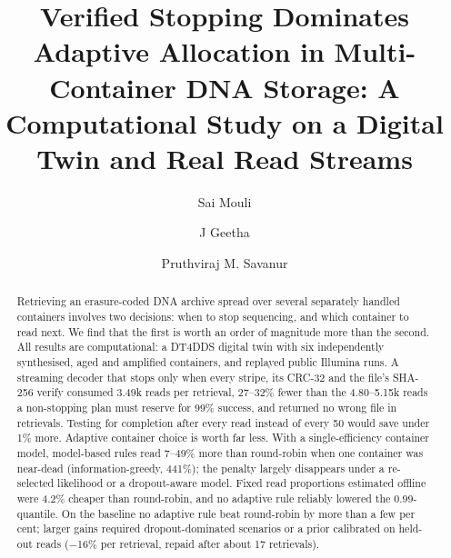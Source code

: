 \documentclass[acmsmall,screen]{acmart}
\begin{document}
\title[Verified Stopping Dominates Adaptive Allocation in Multi-Container DNA Storage]{Verified Stopping Dominates Adaptive Allocation in Multi-Container DNA Storage: A Computational Study on a Digital Twin and Real Read Streams}

\author{Sai Mouli}

\author{J Geetha}

\author{Pruthviraj M. Savanur}

\renewcommand{\shortauthors}{Mouli, Geetha and Savanur}

\begin{abstract}
Retrieving an erasure-coded DNA archive spread over several separately handled containers involves two
decisions: when to stop sequencing, and which container to read next.  We find that the first is worth an
order of magnitude more than the second.  All results are computational: a DT4DDS digital twin with six
independently synthesised, aged and amplified containers, and replayed public Illumina runs.  A streaming
decoder that stops only when every stripe, its CRC-32 and the file's SHA-256 verify consumed 3.49k reads
per retrieval, 27--32\% fewer than the 4.80--5.15k reads a non-stopping plan must reserve for 99\%
success, and returned no wrong file in \SafeN{} retrievals.  Testing for completion after every read
instead of every 50 would save under 1\% more.  Adaptive container choice is worth far less.  With a
single-efficiency container model, model-based rules read 7--49\% more than round-robin when one
container was near-dead (information-greedy, 441\%); the penalty largely disappears under a re-selected
likelihood or a dropout-aware model.  Fixed read proportions estimated offline were 4.2\% cheaper than
round-robin, and no adaptive rule reliably lowered the 0.99-quantile.  On the baseline no adaptive rule
beat round-robin by more than a few per cent; larger gains required dropout-dominated scenarios or a
prior calibrated on held-out reads ($-$16\% per retrieval, repaid after about 17 retrievals).
\end{abstract}
\end{document}
